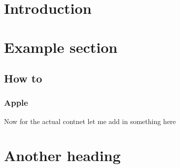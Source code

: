 \documentclass{article}
\begin{document}
\vspace*{\fill}

\newpage

\section{Introduction}
\section{Example section}
\subsection{How to}
\subsubsection{Apple}

Now for the actual contnet let me add in something here

\section{Another heading}
\end{document}
